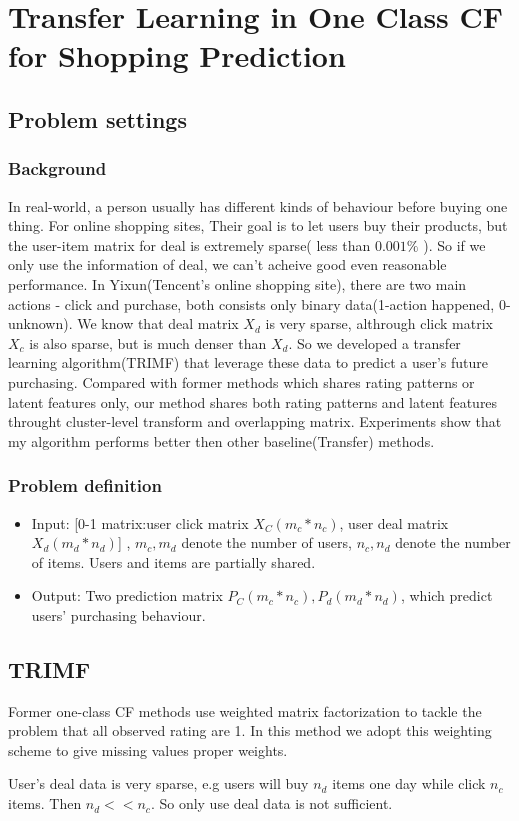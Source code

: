 \chapter{Transfer Learning in One Class CF for Shopping Prediction}
\label{chp:trimf}
\section{Problem settings}
\subsection{Background}
\par{
In real-world, a person usually has different kinds of behaviour before buying one thing. For online shopping sites, Their goal is to let users buy their products, but the user-item matrix for deal is extremely sparse( less than $0.001\%$ ). So if we only use the information of deal, we can't acheive good even reasonable performance. In Yixun(Tencent's online shopping site), there are two main actions - click and purchase, both consists only binary data(1-action happened, 0-unknown). We know that deal matrix $X_d$ is very sparse, althrough click matrix $X_c$ is also sparse, but is much denser than $X_d$. So we developed a transfer learning algorithm(TRIMF) that leverage these data to predict a user's future purchasing. Compared with former methods which shares rating patterns or latent features only, our method shares both rating patterns and latent features throught cluster-level transform and overlapping matrix. Experiments show that my algorithm performs better then other baseline(Transfer) methods.}

\subsection{Problem definition}
  \begin{itemize}
  \item Input: [0-1 matrix:user click matrix $X_C(m_c*n_c)$, user deal matrix $X_d(m_d*n_d)$] , $m_c, m_d$ denote the number of users, $n_c, n_d$ denote the number of items. Users and items are partially shared.
  \item Output: Two prediction matrix $P_C(m_c*n_c), P_d(m_d*n_d)$, which predict users' purchasing behaviour.
  \end{itemize}



\section{TRIMF}
  \par{Former one-class CF methods use weighted matrix factorization to tackle the problem that all observed rating are 1. In this method we adopt this weighting scheme to give missing values proper weights.}
  \par{User's deal data is very sparse, e.g users will buy $n_d$ items one day while click $n_c$ items. Then $n_d << n_c$. So only use deal data is not sufficient.}

